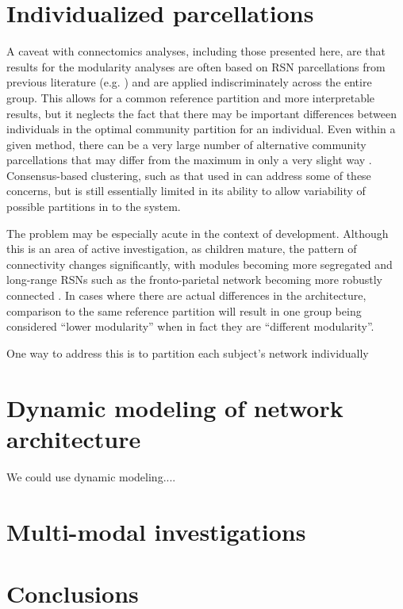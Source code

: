 \section{Individualized parcellations}

A caveat with connectomics analyses, including those presented here, are that results for the modularity analyses are often based on RSN parcellations from previous literature (e.g. \citep{Power2011}) and are applied indiscriminately across the entire group. This allows for a common reference partition and more interpretable results, but it neglects the fact that there may be important differences between individuals in the optimal community partition for an individual. Even within a given method, there can be a very large number of alternative community parcellations that may differ from the maximum in only a very slight way \citep{Good2010}. Consensus-based clustering, such as that used in \citep{Power2011} can address some of these concerns, but is still essentially limited in its ability to allow variability of possible partitions in to the system. 

The problem may be especially acute in the context of development. Although this is an area of active investigation, as children mature, the pattern of connectivity changes significantly, with modules becoming more segregated and long-range RSNs such as the fronto-parietal network becoming more robustly connected \citep{Cao2016}. In cases where there are actual differences in the architecture, comparison to the same reference partition will result in one group being considered ``lower modularity'' when in fact they are ``different modularity''.  

One way to address this is to partition each subject's network individually

\section{Dynamic modeling of network architecture}

We could use dynamic modeling....




\section{Multi-modal investigations}



\section{Conclusions}



